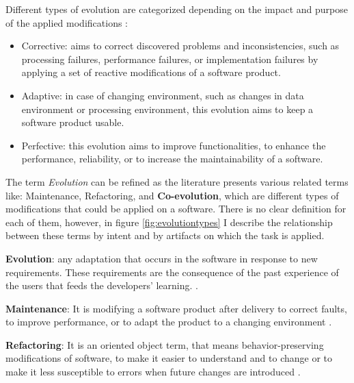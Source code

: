 Different types of evolution are categorized depending on the impact and purpose of the applied modifications \cite{lientz1980software,Swanson1976}:
\begin{itemize}
	
	\item  Corrective: aims to correct discovered problems and inconsistencies, such as processing failures, performance failures, or implementation failures by applying a set of reactive modifications of a software product.  
	
	\item  Adaptive: in case of changing environment, such as changes in data environment or processing environment, this evolution aims to keep a software product usable.
	
	\item Perfective: this evolution aims to improve functionalities, to enhance the performance, reliability, or to increase the maintainability of a software.  
	
\end{itemize}
The term \textit{Evolution} can be refined as the literature presents various related terms like: Maintenance, Refactoring, and \textbf{Co-evolution}, which are different types of modifications that could be applied on a software. There is no clear definition for each of them, however, in figure \ref{fig:evolutiontypes} I describe the relationship between these terms by intent and by artifacts on which the task is applied.


\textbf{Evolution}: any adaptation that occurs in the software in response to new requirements. These requirements are the consequence of the past experience of the users that feeds the developers' learning. \cite{bennett2000software}. 

\textbf{Maintenance}: It is modifying a software product after delivery to correct faults, to improve performance, or to adapt the product to a changing environment \cite{schneidewind1987state}.

\textbf{Refactoring}: It is an oriented object term, that means behavior-preserving modifications of software, to make it easier to understand and to change or to make it less susceptible to errors when future changes are introduced \cite{mens2004survey}. 

